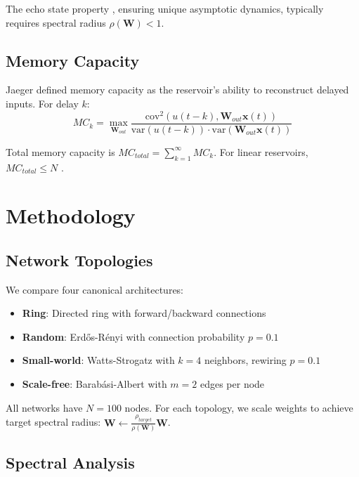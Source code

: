 \documentclass[11pt]{article}
\begin{document}
The echo state property \cite{jaeger2001}, ensuring unique asymptotic dynamics, typically requires spectral radius $\rho(\mathbf{W}) < 1$.

\subsection{Memory Capacity}

Jaeger \cite{jaeger2002} defined memory capacity as the reservoir's ability to reconstruct delayed inputs. For delay $k$:
\begin{equation}
MC_k = \max_{\mathbf{W}_{out}} \frac{\text{cov}^2(u(t-k), \mathbf{W}_{out}\mathbf{x}(t))}{\text{var}(u(t-k)) \cdot \text{var}(\mathbf{W}_{out}\mathbf{x}(t))}
\end{equation}

Total memory capacity is $MC_{total} = \sum_{k=1}^{\infty} MC_k$. For linear reservoirs, $MC_{total} \leq N$ \cite{jaeger2002}.

\section{Methodology}

\subsection{Network Topologies}

We compare four canonical architectures:

\begin{itemize}
\item \textbf{Ring}: Directed ring with forward/backward connections
\item \textbf{Random}: Erdős-Rényi with connection probability $p=0.1$
\item \textbf{Small-world}: Watts-Strogatz with $k=4$ neighbors, rewiring $p=0.1$
\item \textbf{Scale-free}: Barabási-Albert with $m=2$ edges per node
\end{itemize}

All networks have $N=100$ nodes. For each topology, we scale weights to achieve target spectral radius: $\mathbf{W} \leftarrow \frac{\rho_{target}}{\rho(\mathbf{W})} \mathbf{W}$.

\subsection{Spectral Analysis}
\end{document}
